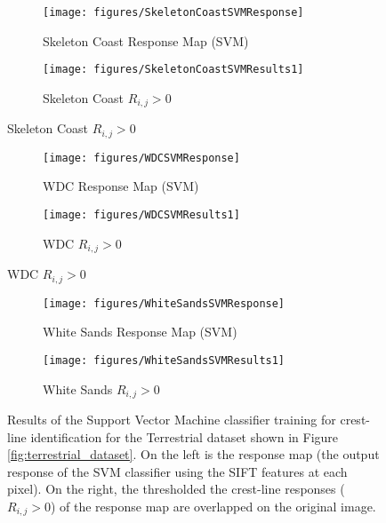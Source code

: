 \begin{figure}[H]
	\ContinuedFloat
	\centering
	\begin{subfigure}{0.48\textwidth}
		\centering
		\texttt{[image: figures/SkeletonCoastSVMResponse]}
		\caption{Skeleton Coast Response Map (SVM)}
		\label{fig:SkeletonCoast_SVM_response}
	\end{subfigure}
	\begin{subfigure}{0.48\textwidth}
		\centering
		\texttt{[image: figures/SkeletonCoastSVMResults1]}
		\caption{ Skeleton Coast $R_{i,j} > 0$}
		\label{fig:SkeletonCoast_SVM_response_overlay}
	\end{subfigure}
\end{figure}
\begin{figure}[H]
	\ContinuedFloat
	\centering
	\begin{subfigure}{0.48\textwidth}
		\centering
		\texttt{[image: figures/WDCSVMResponse]}
		\caption{WDC Response Map (SVM)}
		\label{fig:WDC_SVM_response}
	\end{subfigure}
	\begin{subfigure}{0.48\textwidth}
		\centering
		\texttt{[image: figures/WDCSVMResults1]}
		\caption{ WDC $R_{i,j} > 0$}
		\label{fig:WDC_SVM_response_overlay}
	\end{subfigure}
\end{figure}
\begin{figure}[H]
	\ContinuedFloat
	\centering
	\begin{subfigure}{0.48\textwidth}
		\centering
		\texttt{[image: figures/WhiteSandsSVMResponse]}
		\caption{White Sands Response Map (SVM)}
		\label{fig:WhiteSands_SVM_response}
	\end{subfigure}
	\begin{subfigure}{0.48\textwidth}
		\centering
		\texttt{[image: figures/WhiteSandsSVMResults1]}
		\caption{ White Sands $R_{i,j} > 0$}
		\label{fig:WhiteSands_SVM_response_overlay}
	\end{subfigure}
	\caption{Results of the Support Vector Machine classifier training for crest-line identification for the Terrestrial dataset shown in Figure \ref{fig:terrestrial_dataset}. On the left is the response map (the output response of the SVM classifier using the SIFT features at each pixel). On the right, the thresholded the crest-line responses ($R_{i,j} > 0$) of the response map are overlapped on the original image. }
	\label{fig:SVM_response_results}
\end{figure}

